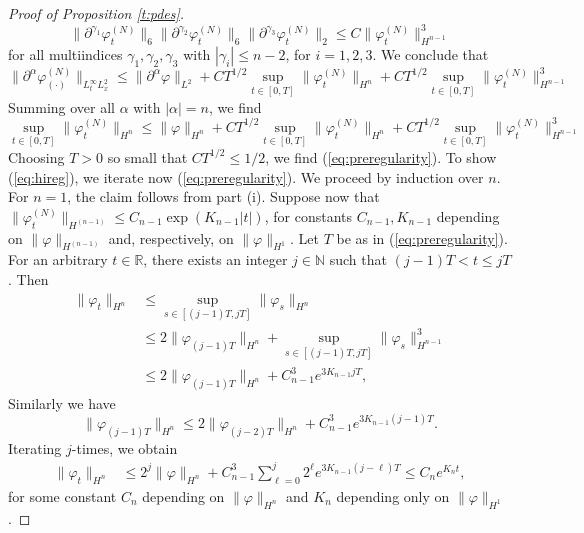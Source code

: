 \documentclass[11pt,a4paper]{article}
\newcommand{\bR}{{\mathbb R}}
\newcommand{\bN}{{\mathbb N}}
\begin{document}
\begin{proof}[Proof of Proposition \ref{t:pdes}]
\[  \| \partial^{\gamma_1} \varphi_t^{(N)} \|_{6} \| \partial^{\gamma_2} \varphi_t^{(N)} \|_6 \| \partial^{\gamma_3} \varphi_t^{(N)} \|_2 \leq C \| \varphi_t^{(N)} \|_{H^{n-1}}^3 \]
for all multiindices $\gamma_1, \gamma_2, \gamma_3$ with $|\gamma_i| \leq n-2$, for $i=1,2,3$. We conclude that
\[ \| \partial^\alpha \varphi^{(N)}_{(\cdot)} \|_{L_t^\infty L_x^2} \leq  \|
    \partial^\alpha \varphi \|_{L^2} + C T^{1/2} \sup_{t \in [0,T]} \| \varphi_t^{(N)} \|_{H^n} + C T^{1/2} \sup_{t \in [0,T]} \| \varphi_t^{(N)} \|_{H^{n-1}}^3 \]   
Summing over all $\alpha$ with $|\alpha| =n$, we find
\[ \sup_{t \in [0,T]} \| \varphi^{(N)}_{t} \|_{H^n} \leq  \| \varphi \|_{H^n} + C T^{1/2} \sup_{t \in [0,T]} \| \varphi_t^{(N)} \|_{H^n} + C T^{1/2} \sup_{t \in [0,T]} \| \varphi_t^{(N)} \|_{H^{n-1}}^3 \]  
Choosing $T > 0$ so small that $CT^{1/2} \leq 1/2$, we find (\ref{eq:preregularity}). To show (\ref{eq:hireg}), we iterate now (\ref{eq:preregularity}). We proceed by induction over $n$. For $n =1$, the claim follows from part (i). Suppose now that $\| \varphi^{(N)}_t \|_{H^{(n-1)}} \leq C_{n-1} \exp (K_{n-1} |t|)$, for constants $C_{n-1}, K_{n-1}$ depending on $\| \varphi \|_{H^{(n-1)}}$ and, respectively, on $\| \varphi \|_{H^1}$. Let $T$ be as in (\ref{eq:preregularity}). For an arbitrary $t \in \bR$, there exists an integer $j \in \bN$ such that $(j-1) T < t \leq jT$. Then
  \begin{align*}
    \| \varphi_t \|_{H^n} & \le \sup_{s \in [(j-1)T, jT]} \| \varphi_s
    \|_{H^n} \\
    & \le 2 \| \varphi_{(j-1)T} \|_{H^n} + \sup_{s \in [(j-1)T, jT]} \|
    \varphi_s \|_{H^{n-1}}^3 \\
    & \le 2 \| \varphi_{(j-1)T} \|_{H^n} + C_{n-1}^3 e^{3 K_{n-1} j T},
  \end{align*}
Similarly we have
  \[
    \| \varphi_{(j-1)T} \|_{H^n} \le 2 \|
    \varphi_{(j-2)T} \|_{H^n} + C_{n-1}^3  e^{3 K_{n-1} (j-1)T}.
  \]
Iterating $j$-times, we obtain
  \begin{align*}
    \| \varphi_t \|_{H^n} & \le 2^j \| \varphi \|_{H^n} + C_{n-1}^3
    \sum_{\ell=0}^j 2^{\ell} e^{3 K_{n-1} (j-\ell)T} \le C_n e^{K_n t},
  \end{align*}
  for some constant $C_n$ depending on $\| \varphi \|_{H^n}$ and $K_n$ depending only on $\| \varphi \|_{H^1}$.


\end{proof}
\end{document}
